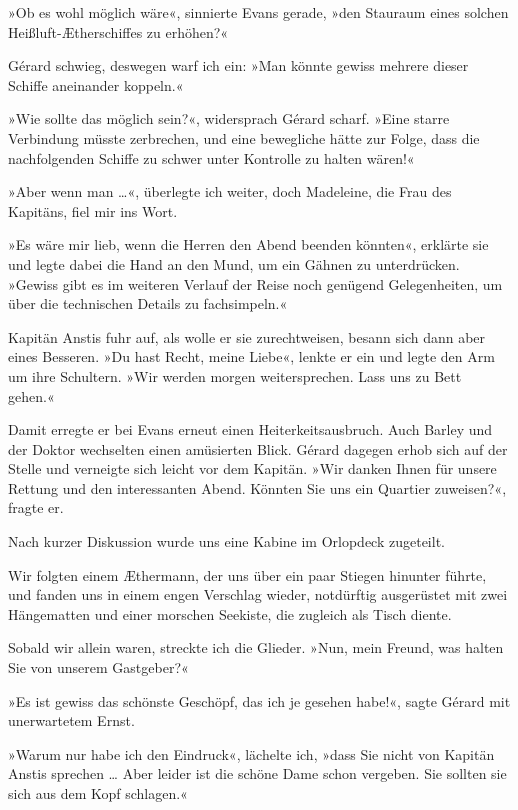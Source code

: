 »Ob es wohl möglich wäre«, sinnierte Evans gerade, »den Stauraum
eines solchen Heißluft-Ætherschiffes zu erhöhen?«

Gérard schwieg, deswegen warf ich ein: »Man könnte gewiss mehrere
dieser Schiffe aneinander koppeln.«

»Wie sollte das möglich sein?«, widersprach Gérard scharf. »Eine
starre Verbindung müsste zerbrechen, und eine bewegliche hätte zur
Folge, dass die nachfolgenden Schiffe zu schwer unter Kontrolle zu
halten wären!«

»Aber wenn man \ldots{}«, überlegte ich weiter, doch Madeleine, die Frau
des Kapitäns, fiel mir ins Wort.

»Es wäre mir lieb, wenn die Herren den Abend beenden könnten«,
erklärte sie und legte dabei die Hand an den Mund, um ein Gähnen zu
unterdrücken. »Gewiss gibt es im weiteren Verlauf der Reise noch
genügend Gelegenheiten, um über die technischen Details zu
fachsimpeln.«

Kapitän Anstis fuhr auf, als wolle er sie zurechtweisen, besann
sich dann aber eines Besseren. »Du hast Recht, meine Liebe«, lenkte
er ein und legte den Arm um ihre Schultern. »Wir werden morgen
weitersprechen. Lass uns zu Bett gehen.«

Damit erregte er bei Evans erneut einen Heiterkeitsausbruch. Auch
Barley und der Doktor wechselten einen amüsierten Blick. Gérard
dagegen erhob sich auf der Stelle und verneigte sich leicht vor dem
Kapitän. »Wir danken Ihnen für unsere Rettung und den interessanten
Abend. Könnten Sie uns ein Quartier zuweisen?«, fragte er.

Nach kurzer Diskussion wurde uns eine Kabine im Orlopdeck
zugeteilt.

Wir folgten einem Æthermann, der uns über ein paar Stiegen hinunter
führte, und fanden uns in einem engen Verschlag wieder, notdürftig
ausgerüstet mit zwei Hängematten und einer morschen Seekiste, die
zugleich als Tisch diente.

\bigpar

Sobald wir allein waren, streckte ich die Glieder. »Nun, mein
Freund, was halten Sie von unserem Gastgeber?«

»Es ist gewiss das schönste Geschöpf, das ich je gesehen habe!«,
sagte Gérard mit unerwartetem Ernst.

»Warum nur habe ich den Eindruck«, lächelte ich, »dass Sie nicht
von Kapitän Anstis sprechen \ldots{} Aber leider ist die schöne Dame
schon vergeben. Sie sollten sie sich aus dem Kopf schlagen.«

